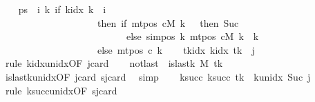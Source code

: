 \begin{isabellebody}
\ \ \isamarkupfalse%
\ {\isacharquery}{\kern0pt}ps\ {\isacharequal}{\kern0pt}\ {\isachardoublequoteopen}{\isasymlambda}i{\isachardot}{\kern0pt}\ {\isacharparenleft}{\kern0pt}{\isasymlambda}k{\isachardot}{\kern0pt}\ if\ k{\isacharunderscore}{\kern0pt}idx\ k\ {\isacharless}{\kern0pt}\ i\isanewline
\ \ \ \ \ \ \ \ \ \ \ \ \ \ \ \ \ \ \ \ then\ {\isacharparenleft}{\kern0pt}if\ mt{\isacharunderscore}{\kern0pt}pos\ cM\ k\ {\isacharequal}{\kern0pt}\ {}\ then\ Suc\ {}\isanewline
\ \ \ \ \ \ \ \ \ \ \ \ \ \ \ \ \ \ \ \ \ \ \ \ \ \ else\ sim{\isacharunderscore}{\kern0pt}pos\ {\isacharquery}{\kern0pt}k\ {\isacharparenleft}{\kern0pt}mt{\isacharunderscore}{\kern0pt}pos\ cM\ k{\isacharparenright}{\kern0pt}\ {\isacharplus}{\kern0pt}\ {\isacharquery}{\kern0pt}k{\isacharparenright}{\kern0pt}\isanewline
\ \ \ \ \ \ \ \ \ \ \ \ \ \ \ \ \ \ \ \ else\ mt{\isacharunderscore}{\kern0pt}pos\ c{}\ k{\isacharparenright}{\kern0pt}{\isachardoublequoteclose}\isanewline
\ \ \isamarkupfalse%
\ tkidx{\isacharcolon}{\kern0pt}\ {\isachardoublequoteopen}k{\isacharunderscore}{\kern0pt}idx\ {\isacharquery}{\kern0pt}tk\ {\isacharequal}{\kern0pt}\ j{\isachardoublequoteclose}\ \isamarkupfalse%
\ {\isacharparenleft}{\kern0pt}rule\ k{\isacharunderscore}{\kern0pt}idx{\isacharunderscore}{\kern0pt}unidx{\isacharbrackleft}{\kern0pt}OF\ jcard{\isacharbrackright}{\kern0pt}{\isacharparenright}{\kern0pt}\isanewline
\ \ \isamarkupfalse%
\ notlast{\isacharcolon}{\kern0pt}\ {\isachardoublequoteopen}{\isasymnot}\ is{\isacharunderscore}{\kern0pt}last{\isacharunderscore}{\kern0pt}k\ M\ {\isacharquery}{\kern0pt}tk{\isachardoublequoteclose}\isanewline
\ \ \ \ \isamarkupfalse%
\ is{\isacharunderscore}{\kern0pt}last{\isacharunderscore}{\kern0pt}k{\isacharunderscore}{\kern0pt}unidx{\isacharbrackleft}{\kern0pt}OF\ jcard{\isacharbrackright}{\kern0pt}\ sjcard\ \isamarkupfalse%
\ simp\isanewline
\ \ \isamarkupfalse%
\ ksucc{\isacharcolon}{\kern0pt}\ {\isachardoublequoteopen}k{\isacharunderscore}{\kern0pt}succ\ {\isacharquery}{\kern0pt}tk\ {\isacharequal}{\kern0pt}\ k{\isacharunderscore}{\kern0pt}unidx\ {\isacharparenleft}{\kern0pt}Suc\ j{\isacharparenright}{\kern0pt}{\isachardoublequoteclose}\ \isamarkupfalse%
\ {\isacharparenleft}{\kern0pt}rule\ k{\isacharunderscore}{\kern0pt}succ{\isacharunderscore}{\kern0pt}unidx{\isacharbrackleft}{\kern0pt}OF\ sjcard{\isacharbrackright}{\kern0pt}{\isacharparenright}{\kern0pt}\isanewline
\ \ \isamarkupfalse%

\end{isabellebody}
